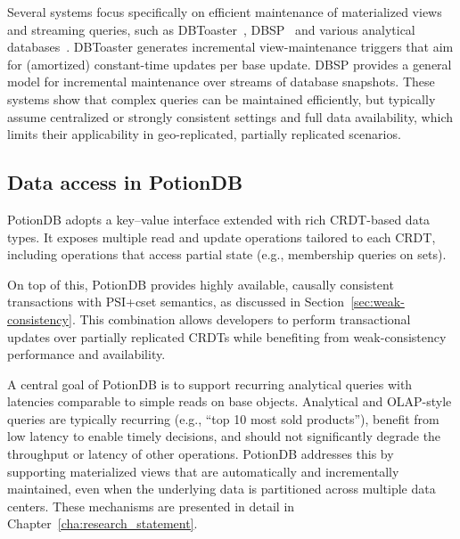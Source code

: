 Several systems focus specifically on efficient maintenance of materialized
views and streaming queries, such as DBToaster~\cite{dbtoaster}, DBSP~\cite{dbsp}
and various analytical databases~\cite{analyticdb,clickhouse}. DBToaster
generates incremental view-maintenance triggers that aim for (amortized)
constant-time updates per base update. DBSP provides a general model for
incremental maintenance over streams of database snapshots. These systems show
that complex queries can be maintained efficiently, but typically assume
centralized or strongly consistent settings and full data availability, which
limits their applicability in geo-replicated, partially replicated scenarios.

\subsection{Data access in PotionDB}

PotionDB adopts a key–value interface extended with rich CRDT-based data types.
It exposes multiple read and update operations tailored to each CRDT, including
operations that access partial state (e.g., membership queries on sets).

On top of this, PotionDB provides highly available, causally consistent
transactions with PSI+cset semantics, as discussed in
Section~\ref{sec:weak-consistency}. This combination allows developers to
perform transactional updates over partially replicated CRDTs while benefiting
from weak-consistency performance and availability.

A central goal of PotionDB is to support recurring analytical queries with
latencies comparable to simple reads on base objects. Analytical and OLAP-style
queries are typically recurring (e.g., “top 10 most sold products”), benefit
from low latency to enable timely decisions, and should not significantly degrade
the throughput or latency of other operations. PotionDB addresses this by
supporting materialized views that are automatically and incrementally
maintained, even when the underlying data is partitioned across multiple data
centers. These mechanisms are presented in detail in
Chapter~\ref{cha:research_statement}.
